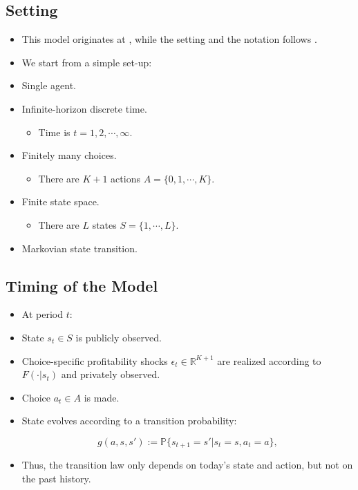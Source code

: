 \documentclass[]{book}
\providecommand{\tightlist}{%
  \setlength{\itemsep}{0pt}\setlength{\parskip}{0pt}}
\begin{document}
\subsection{Setting}\label{setting}

\begin{itemize}
\tightlist
\item
  This model originates at \citet{rustOptimalReplacementGMC1987}, while
  the setting and the notation follows
  \citet{pesendorferAsymptoticLeastSquares2008}.
\item
  We start from a simple set-up:
\item
  Single agent.
\item
  Infinite-horizon discrete time.

  \begin{itemize}
  \tightlist
  \item
    Time is \(t = 1, 2, \cdots, \infty\).
  \end{itemize}
\item
  Finitely many choices.

  \begin{itemize}
  \tightlist
  \item
    There are \(K + 1\) actions \(A = \{0, 1, \cdots, K\}\).
  \end{itemize}
\item
  Finite state space.

  \begin{itemize}
  \tightlist
  \item
    There are \(L\) states \(S = \{1, \cdots, L\}\).
  \end{itemize}
\item
  Markovian state transition.
\end{itemize}

\subsection{Timing of the Model}\label{timing-of-the-model}

\begin{itemize}
\tightlist
\item
  At period \(t\):
\item
  State \(s_t \in S\) is publicly observed.
\item
  Choice-specific profitability shocks
  \(\epsilon_t \in \mathbb{R}^{K + 1}\) are realized according to
  \(F(\cdot|s_t)\) and privately observed.
\item
  Choice \(a_t \in A\) is made.
\item
  State evolves according to a transition probability:

  \begin{equation}
  g(a, s, s') := \mathbb{P}\{s_{t + 1} = s'|s_t = s, a_t = a\},
  \end{equation}
\item
  Thus, the transition law only depends on today's state and action, but
  not on the past history.
\end{itemize}
\end{document}
